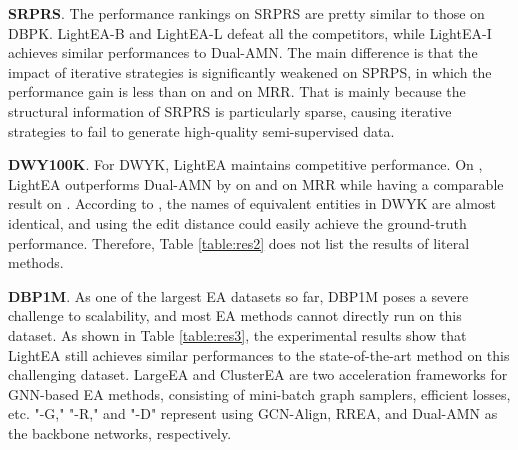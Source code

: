 \documentclass[11pt]{article}
\begin{document}
\noindent
\textbf{SRPRS}.
The performance rankings on SRPRS are pretty similar to those on DBPK.
LightEA-B and LightEA-L defeat all the competitors, while LightEA-I achieves similar performances to Dual-AMN.
The main difference is that the impact of iterative strategies is significantly weakened on SPRPS, in which the performance gain is less than  on  and  on MRR.
That is mainly because the structural information of SRPRS is particularly sparse, causing iterative strategies to fail to generate high-quality semi-supervised data.

\noindent
\textbf{DWY100K}.
For DWYK, LightEA maintains competitive performance.
On , LightEA outperforms Dual-AMN by  on  and  on MRR while having a comparable result on .
According to \citet{9174835}, the names of equivalent entities in DWYK are almost identical, and using the edit distance could easily achieve the ground-truth performance.
Therefore, Table \ref{table:res2} does not list the results of literal methods.

\noindent
\textbf{DBP1M}.
As one of the largest EA datasets so far, DBP1M poses a severe challenge to scalability, and most EA methods cannot directly run on this dataset.
As shown in Table \ref{table:res3}, the experimental results show that LightEA still achieves similar performances to the state-of-the-art method on this challenging dataset.
LargeEA and ClusterEA are two acceleration frameworks for GNN-based EA methods, consisting of mini-batch graph samplers, efficient losses, etc.
"-G," "-R," and "-D" represent using GCN-Align, RREA, and Dual-AMN as the backbone networks, respectively.

\begin{table}
\begin{center}
\end{center}
\caption{Time costs on all datasets (seconds). }\label{tabel:time}
\end{table}
\end{document}
